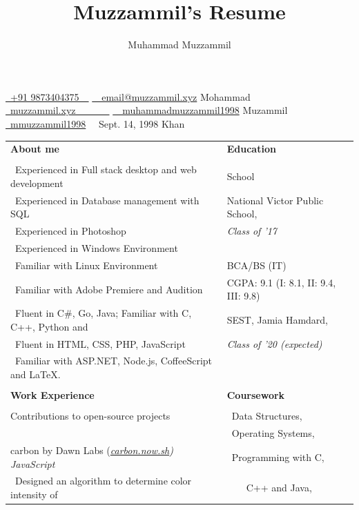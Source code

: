 \documentclass[12pt, a4paper]{article}
\title{Muzzammil's Resume}
\author{Muhammad Muzzammil}
\def\phone{{\FA \faPhone}}
\def\email{{\FA \faEnvelope0}}
\def\website{{\FA \faGlobe}}
\def\github{{\FA \faGithub}}
\def\twitter{{\FA \faTwitter}}
\def\bday{{\FA \faBirthdayCake}}
\def\p#1{\textbullet \ #1}
\def\heading#1{\Large \bfseries #1 \normalsize \normalfont }
\def\subheading#1{\large #1 \normalsize \dotfill}
\def\name#1{\Huge #1 \normalsize \\}
\def\httpslink#1{\href{https://#1}{#1}}
\def\gitlink#1{ \href{https://github.com/#1}{\github}}
\def\projectlink#1{\itshape \httpslink{#1}\normalfont}
\def\lang#1{\hfill #1\normalfont}
\begin{document}
    \noindent
    \href{tel:+91 9873404375}{ \phone\ +91 9873404375\ \ }
    \href{mailto:email@muzzammil.xyz}{ \email \ \ email@muzzammil.xyz} 
    \hfill
    \name{Mohammad}
    \href{https://muzzammil.xyz}{ \website\ muzzammil.xyz\ \ \ \ \ \ \ }
    \href{https://git.muzzammil.xyz/?ref=resume}{ \github\ \ muhammadmuzzammil1998} 
    \hfill 
    \name{Muzammil}
    \href{https://twitter.com/mmuzzammil1998}{ \twitter\ mmuzzammil1998}
    { \bday\ \ Sept. 14, 1998}
    \hfill 
    \name{Khan}
    \begin{center}
        \dotfill
    \end{center}
    \noindent
    \begin{tabular}{l l}
        \heading{About me} & \heading{Education} \\
         &  \\
        \p{Experienced in Full stack desktop and web development} & \subheading{School} \\
        \p{Experienced in Database management with SQL} & National Victor Public School, \\
        \p{Experienced in Photoshop} & \itshape Class of '17 \\
        \p{Experienced in Windows Environment} &  \\
        \p{Familiar with Linux Environment} & \subheading{BCA/BS (IT)} \\
        \p{Familiar with Adobe Premiere and Audition} & CGPA: 9.1 (I: 8.1, II: 9.4, III: 9.8) \\
        \p{Fluent in C\#, Go, Java; Familiar with C, C++, Python and} & SEST, Jamia Hamdard, \\
        \p{Fluent in HTML, CSS, PHP, JavaScript} & \itshape Class of '20 (expected) \\
        \p{Familiar with ASP.NET, Node.js, CoffeeScript and \LaTeX.} &  \\
         &  \\
        \heading{Work Experience} & \heading{Coursework} \\
         &  \\
        \subheading{Contributions to open-source projects} & \p{Data Structures}, \\
         & \p{Operating Systems},  \\
        carbon by Dawn Labs (\projectlink{carbon.now.sh})\gitlink{muhammadmuzzammil1998?org=dawnlabs}\lang{JavaScript} & \p{Programming with C,} \\
        \p{Designed an algorithm to determine color intensity of} & \ \ \ \ C++ and Java,  \\

\end{tabular}
\end{document}
